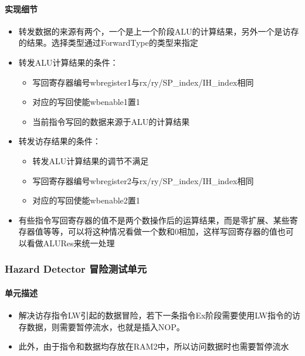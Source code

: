 \documentclass{article}
\begin{document}
\paragraph{实现细节}
\begin{itemize}
	\item 转发数据的来源有两个，一个是上一个阶段ALU的计算结果，另外一个是访存的结果。选择类型通过ForwardType的类型来指定
	\item 转发ALU计算结果的条件：
	\begin{itemize}
		\item 写回寄存器编号wbregister1与rx/ry/SP\_index/IH\_index相同
		
		\item 对应的写回使能wbenable1置1
		
		\item 当前指令写回的数据来源于ALU的计算结果
	\end{itemize}
	\item 转发访存结果的条件：
	\begin{itemize}
		\item 转发ALU计算结果的调节不满足
		\item 写回寄存器编号wbregister2与rx/ry/SP\_index/IH\_index相同
		\item 对应的写回使能wbenable2置1
	\end{itemize}
	\item 有些指令写回寄存器的值不是两个数操作后的运算结果，而是零扩展、某些寄存器值等等，可以将这种情况看做一个数和0相加，这样写回寄存器的值也可以看做ALURes来统一处理
\end{itemize}

\subsubsection{Hazard Detector 冒险测试单元}

\paragraph{单元描述}
\begin{itemize}
	\item 解决访存指令LW引起的数据冒险，若下一条指令Ex阶段需要使用LW指令的访存数据，则需要暂停流水，也就是插入NOP。
	
	\item 此外，由于指令和数据均存放在RAM2中，所以访问数据时也需要暂停流水 
\end{itemize}
\end{document}
